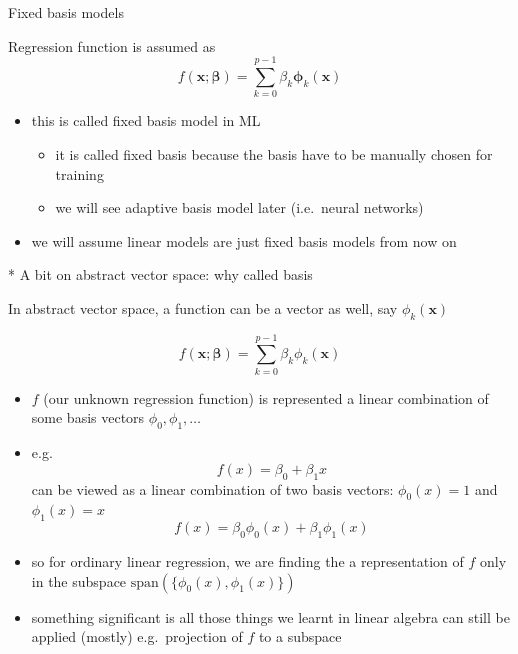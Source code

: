 \documentclass[ignorenonframetext,aspectratio=169]{beamer}
\providecommand{\tightlist}{%
  \setlength{\itemsep}{0pt}\setlength{\parskip}{0pt}}
\newcommand{\vv}[1]{\boldsymbol{#1}}
\begin{document}
\begin{frame}{Fixed basis models}
\protect\hypertarget{fixed-basis-models}{}

Regression function is assumed as
\[f(\vv{x};\vv{\beta})=\sum_{k=0}^{p-1} {\beta}_k \vv{\phi}_k(\vv{x})\]

\begin{itemize}
\tightlist
\item
  this is called fixed basis model in ML

  \begin{itemize}
  \tightlist
  \item
    it is called fixed basis because the basis have to be manually
    chosen for training
  \item
    we will see adaptive basis model later (i.e.~neural networks)
  \end{itemize}
\item
  we will assume linear models are just fixed basis models from now on
\end{itemize}

\end{frame}

\begin{frame}{* A bit on abstract vector space: why called basis}
\protect\hypertarget{a-bit-on-abstract-vector-space-why-called-basis}{}

\small

In abstract vector space, a function can be a vector as well, say
\(\phi_k(\vv{x})\)

\[f(\vv{x};\vv{\beta})=\sum_{k=0}^{p-1} {\beta}_k {\phi}_k(\vv{x})\]

\begin{itemize}
\tightlist
\item
  \(f\) (our unknown regression function) is represented a linear
  combination of some basis vectors \(\phi_0,\phi_1,\ldots\)
\item
  e.g. \[f(x) = \beta_0 +\beta_1x\] can be viewed as a linear
  combination of two basis vectors: \(\phi_0(x)= 1\) and
  \(\phi_1(x) =x\) \[f(x) = \beta_0 \phi_0(x)+\beta_1\phi_1(x)\]
\item
  so for ordinary linear regression, we are finding the a representation
  of \(f\) only in the subspace
  \(\text{span}(\{\phi_0(x), \phi_1(x)\})\)
\item
  something significant is all those things we learnt in linear algebra
  can still be applied (mostly) e.g.~projection of \(f\) to a subspace
\end{itemize}

\end{frame}
\end{document}
